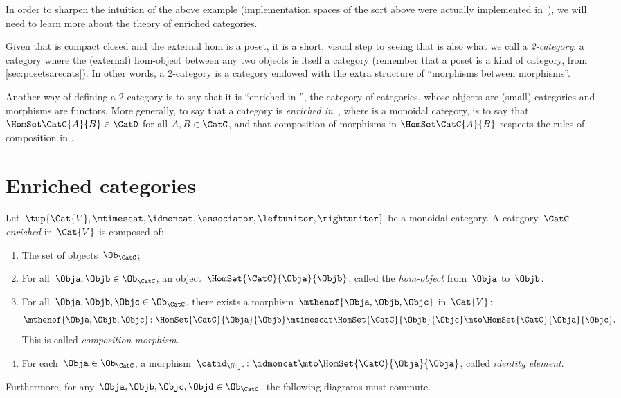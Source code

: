 In order to sharpen the intuition of the above example (implementation spaces of the sort above were actually implemented in~\cite{censi}), we will need to learn more about the theory of enriched categories.

Given that \DP is compact closed and the external hom is a poset, it is a short, visual step to seeing that \DP is also what we call a \emph{2-category}: a category where the (external) hom-object between any two objects is itself a category (remember that a poset is a kind of category, from \cref{sec:posetsarecats}).
In other words, a 2-category is a category endowed with the extra structure of ``morphisms between morphisms''.

Another way of defining a 2-category is to say that it is ``enriched in \Category'', the category of categories, whose objects are (small) categories and morphisms are functors.
More generally, to say that a category \CatC is \emph{enriched in~\CatD}, where \CatD is a monoidal category, is to say that $\HomSet\CatC{A}{B} \in \CatD$ for all $A,B \in \CatC$, and that composition of morphisms in $\HomSet\CatC{A}{B}$ respects the rules of composition in \CatD.

\section{Enriched categories}
\label{sec:enrichment-enriched-categories}

\begin{ctdefinition}
    \label{def:enriched_cat}
    Let~$\tup{\Cat{V},\mtimescat, \idmoncat, \associator, \leftunitor,\rightunitor}$ be a monoidal category.
    A category~$\CatC$ \emph{enriched} in~$\Cat{V}$ is composed of:
    \begin{enumerate}
        \item The set of objects~$\Ob_\CatC$;
        \item For all~$\Obja,\Objb\in \Ob_\CatC$, an object~$\HomSet{\CatC}{\Obja}{\Objb}$, called the \emph{hom-object} from~$\Obja$ to~$\Objb$.
        \item For all~$\Obja, \Objb, \Objc\in \Ob_\CatC$, there exists a morphism~$\mthenof{\Obja,\Objb,\Objc}$ in~$\Cat{V}$:
              \begin{equation}
                  \mthenof{\Obja,\Objb,\Objc}\colon \HomSet{\CatC}{\Obja}{\Objb}\mtimescat \HomSet{\CatC}{\Objb}{\Objc}\mto \HomSet{\CatC}{\Obja}{\Objc}.
              \end{equation}
              This is called \emph{composition morphism}.
        \item For each~$\Obja\in \Ob_\CatC$, a morphism~$\catid_\Obja\colon \idmoncat \mto \HomSet{\CatC}{\Obja}{\Obja}$, called \emph{identity element}.
    \end{enumerate}
    Furthermore, for any~$\Obja,\Objb,\Objc,\Objd\in \Ob_\CatC$, the following diagrams must commute.
\end{ctdefinition}

